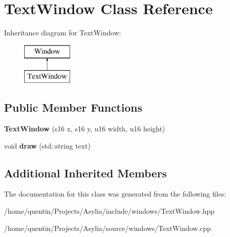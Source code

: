 \hypertarget{classTextWindow}{\section{Text\-Window Class Reference}
\label{classTextWindow}
}
Inheritance diagram for Text\-Window\-:\begin{figure}[H]
\begin{center}
\leavevmode
\includegraphics[height=2.000000cm]{classTextWindow}
\end{center}
\end{figure}
\subsection*{Public Member Functions}
\begin{DoxyCompactItemize}
\item 
\hypertarget{classTextWindow_a7f3145cfeeac7765e4e876cefd561754}{{\bfseries Text\-Window} (s16 x, s16 y, u16 width, u16 height)}\label{classTextWindow_a7f3145cfeeac7765e4e876cefd561754}

\item 
\hypertarget{classTextWindow_a47312e546dfbb3de9e87a34c07447985}{void {\bfseries draw} (std\-::string text)}\label{classTextWindow_a47312e546dfbb3de9e87a34c07447985}

\end{DoxyCompactItemize}
\subsection*{Additional Inherited Members}


The documentation for this class was generated from the following files\-:\begin{DoxyCompactItemize}
\item 
/home/quentin/\-Projects/\-Asylia/include/windows/Text\-Window.\-hpp\item 
/home/quentin/\-Projects/\-Asylia/source/windows/Text\-Window.\-cpp\end{DoxyCompactItemize}
